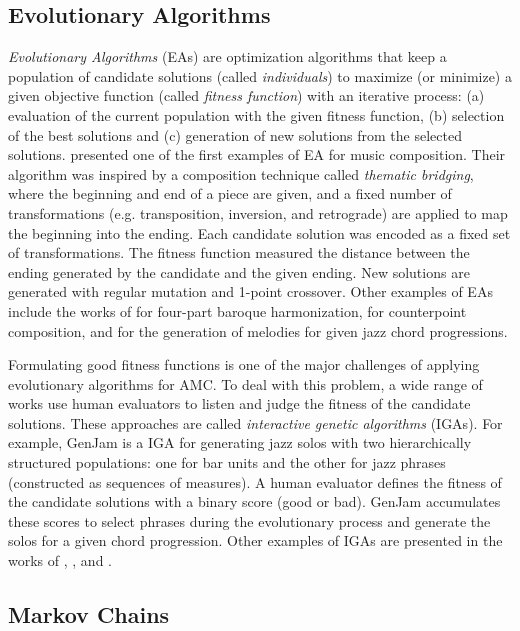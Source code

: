 \subsection{Evolutionary Algorithms}

\textit{Evolutionary Algorithms} (EAs) are optimization algorithms that keep a population of candidate solutions (called \textit{individuals}) to maximize (or minimize) a given objective function (called \textit{fitness function}) with an iterative process: (a) evaluation of the current population with the given fitness function, (b) selection of the best solutions and (c) generation of new solutions from the selected solutions. \citet{horner1991genetic} presented one of the first examples of EA for music composition. Their algorithm was inspired by a composition technique called \textit{thematic bridging}, where the beginning and end of a piece are given, and a fixed number of transformations (e.g. transposition, inversion, and retrograde) are applied to map the beginning into the ending. Each candidate solution was encoded as a fixed set of transformations. The fitness function measured the distance between the ending generated by the candidate and the given ending. New solutions are generated with regular mutation and 1-point crossover. Other examples of EAs include the works of \citet{mcintyre1994bach} for four-part baroque harmonization, \citet{polito1997musica} for counterpoint composition, and \citet{papadopoulos1998genetic} for the generation of melodies for given jazz chord progressions.

Formulating good fitness functions is one of the major challenges of applying evolutionary algorithms for AMC. To deal with this problem, a wide range of works use human evaluators to listen and judge the fitness of the candidate solutions. These approaches are called \textit{interactive genetic algorithms} (IGAs). For example, GenJam \cite{biles1994genjam} is a IGA for generating jazz solos with two hierarchically structured populations: one for bar units and the other for jazz phrases (constructed as sequences of measures). A human evaluator defines the fitness of the candidate solutions with a binary score (good or bad). GenJam accumulates these scores to select phrases during the evolutionary process and generate the solos for a given chord progression. Other examples of IGAs are presented in the works of \citet{jacob1995composing}, \citet{schmidl2008pseudo}, and \citet{tokui2000music}.

\subsection{Markov Chains}

